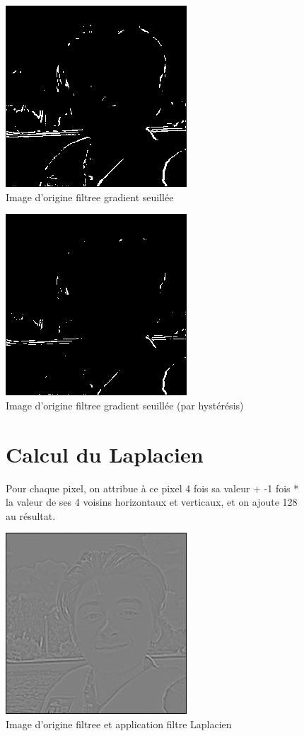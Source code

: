 \documentclass{article}
\begin{document}
\begin{figure}[h!]
\centerline{\includegraphics[scale=1.]{./rendus/MOIMOIETMOIfiltreegradientseuille.png}}
\caption{Image d'origine filtree gradient seuillée}
\end{figure}

\begin{figure}[h!]
\centerline{\includegraphics[scale=1.]{./rendus/MOIMOIETMOIfiltreegradientseuillehysteresis.png}}
\caption{Image d'origine filtree gradient seuillée (par hystérésis)}
\end{figure}

\begin{figure}[h!]
\section{Calcul du Laplacien}
Pour chaque pixel, on attribue à ce pixel 4 fois sa valeur + -1 fois * la valeur de ses 4 voisins horizontaux et verticaux, et on ajoute 128 au résultat.

\centerline{\includegraphics[scale=1.]{./rendus/MOIMOIETMOIfiltreeLaplace.png}}
\caption{Image d'origine filtree et application filtre Laplacien}
\end{figure}
\end{document}
